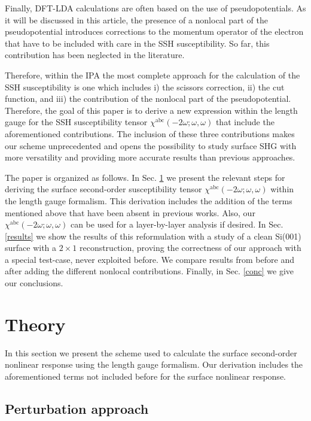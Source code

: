 \documentclass[floatfix,prb,aps,superscriptaddress,showpacs,11pt,preprint,letterpaper]{revtex4}
\begin{document}
Finally, DFT-LDA calculations are often based on the use of pseudopotentials.
As it will be discussed 
in this article, the presence of a nonlocal part of the
pseudopotential introduces
corrections to
the momentum operator of the electron that have to be included with care in 
the SSH susceptibility. So far, this contribution has been neglected in the 
literature.

Therefore, within the IPA the most complete approach for the calculation of 
the SSH susceptibility is one which includes i) the scissors correction, 
ii) the cut function, and iii) the contribution of the nonlocal part of the 
pseudopotential. Therefore, the goal of this paper is to derive a new 
expression within the length gauge for the SSH susceptibility tensor 
$\chi^{\mathrm{a}\mathrm{b}\mathrm{c}}(-2\omega;\omega,\omega)$ 
that include the aforementioned contributions. The inclusion of these three 
contributions makes our scheme unprecedented and opens the possibility to 
study surface SHG with more versatility and providing more accurate results 
than previous approaches. 

The paper is organized as follows. In Sec. \ref{theory} we present the 
relevant steps for deriving the surface second-order susceptibility tensor
$\chi^{\mathrm{a}\mathrm{b}\mathrm{c}}(-2\omega;\omega,\omega)$ within the 
length gauge formalism. This derivation includes the addition of the terms 
mentioned above that have been absent in previous works. Also, our 
$\chi^{\mathrm{a}\mathrm{b}\mathrm{c}}(-2\omega;\omega,\omega)$ can be used 
for a layer-by-layer analysis if desired. In Sec. \ref{results} we show the 
results of this reformulation with a study of a clean Si(001) surface with a 
$2 \times 1$ reconstruction, 
proving the correctness of our approach with a special test-case,
never exploited before.
We compare results from before and after adding 
the different nonlocal contributions. Finally, in Sec. \ref{conc} we give 
our conclusions.

\section{Theory}

\label{theory}

In this section we present the scheme used to calculate the surface second-order
nonlinear response using the length gauge formalism.
Our derivation includes the aforementioned terms not included
before for the surface nonlinear
response. 

\subsection{Perturbation approach}
\end{document}
